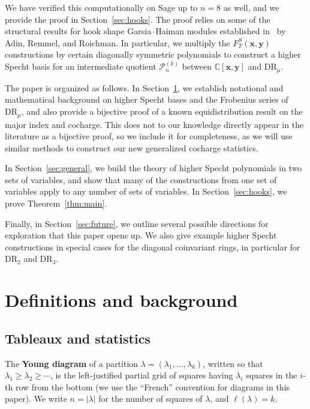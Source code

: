 \documentclass[ALCO,Unicode]{cedram}
\newcommand{\DR}{\mathrm{DR}}
\begin{document}
We have verified this computationally on Sage up to $n=8$ as well, and we provide the proof in Section~\ref{sec:hooks}.  The proof relies on some of the structural results for hook shape Garsia--Haiman modules established in~\cite{HookBases} by Adin, Remmel, and Roichman.  In particular, we multiply the $F_T^S(\mathbf{x},\mathbf{y})$ constructions by certain diagonally symmetric polynomials to construct a higher Specht basis for an intermediate quotient $\mathcal{P}_n^{(k)}$ between $\mathbb{C}[\mathbf{x},\mathbf{y}]$ and $\DR_\mu$.

The paper is organized as follows.  In Section~\ref{sec:background}, we establish notational and mathematical background on higher Specht bases and the Frobenius series of $\DR_\mu$, and also provide a bijective proof of a known equidistribution result on the major index and cocharge.  This does not to our knowledge directly appear in the literature as a bijective proof, so we include it for completeness, as we will use similar methods to construct our new generalized cocharge statistics.

In Section~\ref{sec:general}, we build the theory of higher Specht polynomials in two sets of variables, and show that many of the constructions from one set of variables apply to any number of sets of variables.  In Section~\ref{sec:hooks}, we prove Theorem~\ref{thm:main}.

Finally, in Section~\ref{sec:future}, we outline several possible directions for exploration that this paper opens up.  We also give example higher Specht constructions in special cases for the diagonal coinvariant rings, in particular for $\DR_2$ and $\DR_3$.


\section{Definitions and background}\label{sec:background}

\subsection{Tableaux and statistics}

The \textbf{Young diagram} of a partition $\lambda=(\lambda_1,\ldots,\lambda_k)$, written so that $\lambda_1\ge \lambda_2\ge \cdots$, is the left-justified partial grid of squares having $\lambda_i$ squares in the $i$-th row from the bottom (we use the ``French'' convention for diagrams in this paper).  We write $n=|\lambda|$ for the number of squares of $\lambda$, and $\ell(\lambda)=k$.
\end{document}
